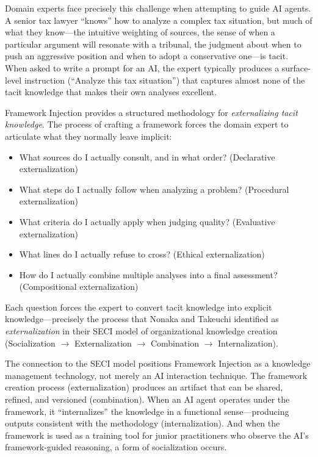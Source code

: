 \documentclass[12pt,a4paper]{article}
\begin{document}
Domain experts face precisely this challenge when attempting to guide AI agents. A senior tax lawyer ``knows'' how to analyze a complex tax situation, but much of what they know---the intuitive weighting of sources, the sense of when a particular argument will resonate with a tribunal, the judgment about when to push an aggressive position and when to adopt a conservative one---is tacit. When asked to write a prompt for an AI, the expert typically produces a surface-level instruction (``Analyze this tax situation'') that captures almost none of the tacit knowledge that makes their own analyses excellent.

Framework Injection provides a structured methodology for \emph{externalizing tacit knowledge}. The process of crafting a framework forces the domain expert to articulate what they normally leave implicit:

\begin{itemize}
    \item What sources do I actually consult, and in what order? (Declarative externalization)
    \item What steps do I actually follow when analyzing a problem? (Procedural externalization)
    \item What criteria do I actually apply when judging quality? (Evaluative externalization)
    \item What lines do I actually refuse to cross? (Ethical externalization)
    \item How do I actually combine multiple analyses into a final assessment? (Compositional externalization)
\end{itemize}

Each question forces the expert to convert tacit knowledge into explicit knowledge---precisely the process that Nonaka and Takeuchi \citep{nonaka1995knowledge} identified as \emph{externalization} in their SECI model of organizational knowledge creation (Socialization $\rightarrow$ Externalization $\rightarrow$ Combination $\rightarrow$ Internalization).

The connection to the SECI model positions Framework Injection as a knowledge management technology, not merely an AI interaction technique. The framework creation process (externalization) produces an artifact that can be shared, refined, and versioned (combination). When an AI agent operates under the framework, it ``internalizes'' the knowledge in a functional sense---producing outputs consistent with the methodology (internalization). And when the framework is used as a training tool for junior practitioners who observe the AI's framework-guided reasoning, a form of socialization occurs.
\end{document}
